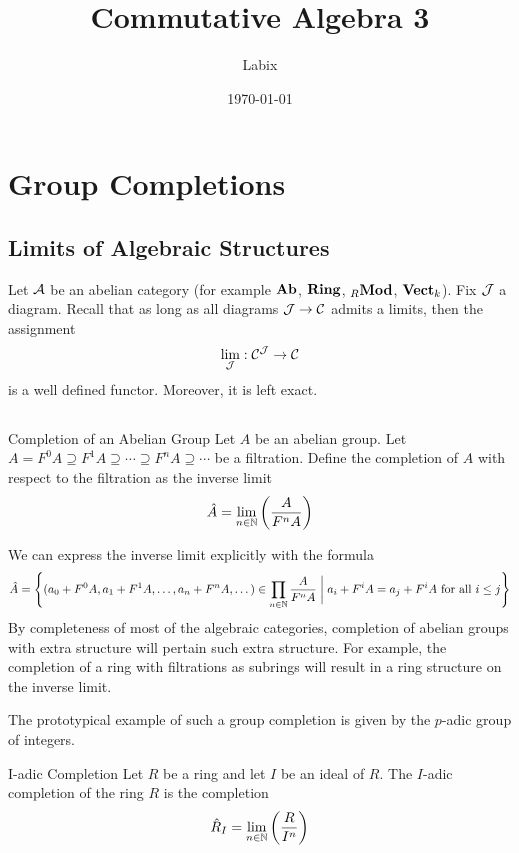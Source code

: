 \documentclass[a4paper]{article}
\title{Commutative Algebra 3}
\author{Labix}
\date{\today}
\begin{document}
\maketitle
\begin{abstract}
\end{abstract}
\pagebreak
\tableofcontents
\pagebreak

\pagebreak

\section{Group Completions}
\subsection{Limits of Algebraic Structures}
Let $\mathcal{A}$ be an abelian category (for example $\bold{Ab}$, $\bold{Ring}$, ${_R\bold{Mod}}$, $\bold{Vect}_k$). Fix $\mathcal{J}$ a diagram. Recall that as long as all diagrams $\mathcal{J}\to\mathcal{C}$ admits a limits, then the assignment $$\lim_{\mathcal{J}}:\mathcal{C}^{\mathcal{J}}\to\mathcal{C}$$ is a well defined functor. Moreover, it is left exact. 

\subsection{}
\begin{defn}{Completion of an Abelian Group}{} Let $A$ be an abelian group. Let $A=F^0A\supseteq F^1A\supseteq\cdots\supseteq F^nA\supseteq\cdots$ be a filtration. Define the completion of $A$ with respect to the filtration as the inverse limit $$\hat{A}=\lim_{n\in\mathbb{N}}\left(\frac{A}{F^nA}\right)$$
\end{defn}

We can express the inverse limit explicitly with the formula $$\hat{A}=\left\{(a_0+F^0A,a_1+F^1A,\dots,a_n+F^nA,\dots)\in\prod_{n\in\mathbb{N}}\frac{A}{F^nA}\;\bigg{|}\;a_i+F^iA=a_j+F^iA\text{ for all }i\leq j\right\}$$ By completeness of most of the algebraic categories, completion of abelian groups with extra structure will pertain such extra structure. For example, the completion of a ring with filtrations as subrings will result in a ring structure on the inverse limit. 

The prototypical example of such a group completion is given by the $p$-adic group of integers. 

\begin{defn}{I-adic Completion}{} Let $R$ be a ring and let $I$ be an ideal of $R$. The $I$-adic completion of the ring $R$ is the completion $$\hat{R}_I=\lim_{n\in\mathbb{N}}\left(\frac{R}{I^n}\right)$$
\end{defn}
\end{document}
